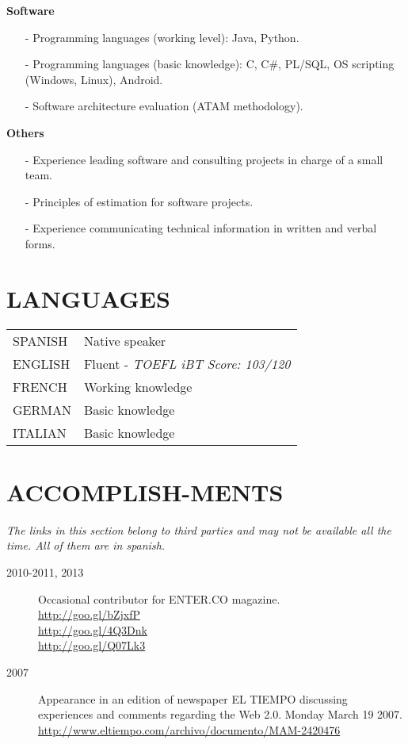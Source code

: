 \documentclass[line,margin]{res}
\begin{document}
\begin{resume}
\begin{itemize}
  {\bf Software}
    \begin{itemize} %
	  \item[-] Programming languages (working level): Java, Python.\\
	  \item[-] Programming languages (basic knowledge): C, C\#, PL/SQL, OS scripting (Windows, Linux), Android.
	  \item[-] Software architecture evaluation (ATAM methodology).	  
    \end{itemize}

    {\bf Others}
    \begin{itemize} %
	  \item[-] Experience leading software and consulting projects in charge of a small team.
	  \item[-] Principles of estimation for software projects.
	  \item[-] Experience communicating technical information in written and verbal forms.	  
    \end{itemize}
	
	\section{LANGUAGES} 
	\begin{tabular}{l l}
		SPANISH & Native speaker 								\\
		ENGLISH  & Fluent - \emph{TOEFL iBT Score: 103/120} \\
		FRENCH & Working knowledge                               \\
		GERMAN & Basic knowledge                             \\
		ITALIAN & Basic knowledge                             \\
	\end{tabular}
 
 


\section{ACCOMPLISH-MENTS} 

\emph{The links in this section belong to third parties and may not be available all the time. All of them are in spanish.}
    \begin{description}
		\item[2010-2011, 2013] Occasional contributor for ENTER.CO magazine. \\ \url{http://goo.gl/bZjxfP}\\ \url{http://goo.gl/4Q3Dnk}
		\\ \url{http://goo.gl/Q07Lk3}		
		\item[2007] Appearance in an edition of newspaper EL TIEMPO discussing experiences and comments regarding the Web 2.0. Monday March 19 2007.\\
	\url{http://www.eltiempo.com/archivo/documento/MAM-2420476}    		
	\end{description}


\end{itemize}
\end{resume}
\end{document}
